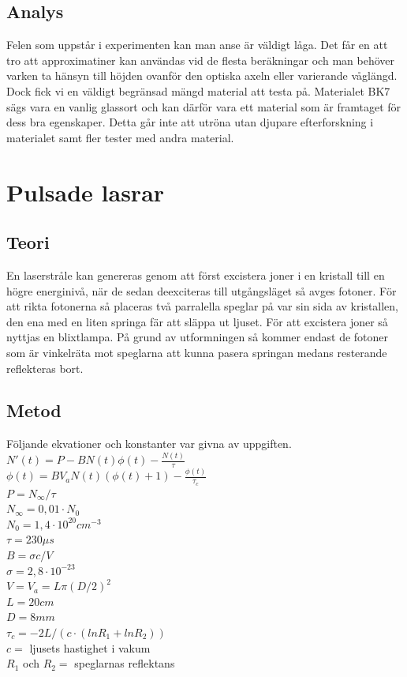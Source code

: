 \documentclass[12pt]{article}
\begin{document}
\subsection{Analys}
Felen som uppstår i experimenten kan man anse är väldigt låga. Det får en att tro att approximatiner kan användas vid de flesta beräkningar och man behöver varken ta hänsyn till höjden ovanför den optiska axeln eller varierande våglängd. Dock fick vi en väldigt begränsad mängd material att testa på. Materialet BK7 sägs vara en vanlig glassort och kan därför vara ett material som är framtaget för dess bra egenskaper. Detta går inte att utröna utan djupare efterforskning i materialet samt fler tester med andra material.


\section{Pulsade lasrar}

\subsection{Teori}

En laserstråle kan genereras genom att först excistera joner i en kristall till en högre energinivå, när de sedan deexciteras till utgångsläget så avges fotoner. För att rikta fotonerna så placeras två parralella speglar på var sin sida av kristallen, den ena med en liten springa fär att släppa ut ljuset. För att excistera joner så nyttjas en blixtlampa. På grund av utformningen så kommer endast de fotoner som är vinkelräta mot speglarna att kunna pasera springan medans resterande reflekteras bort.  

\subsection{Metod}
Följande ekvationer och konstanter var givna av uppgiften.\\
$N'(t)=P-BN(t)\phi(t)-\frac{N(t)}{\tau}$\\
$\phi(t)=BV_aN(t)(\phi(t)+1)-\frac{\phi(t)}{\tau_c}$\\
$P=N_\infty/\tau$\\
$N_\infty=0,01 \cdot N_0$\\
$N_0=1,4 \cdot 10^{20} cm^{-3} $\\
$\tau = 230 \mu s$\\
$B=\sigma c / V$\\
$\sigma = 2,8 \cdot 10^{-23}$\\
$V=V_a=L\pi(D/2)^2$\\
$L=20cm$\\
$D=8mm$\\
$\tau_c=-2L/(c \cdot (ln R_1 + ln R_2))$\\
$c =$ ljusets hastighet i vakum\\
$R_1$ och $R_2 =$ speglarnas reflektans\\
\end{document}

